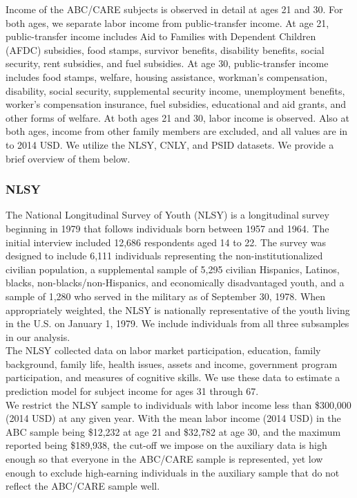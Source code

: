 \noindent Income of the ABC/CARE subjects is observed in detail at ages 21 and 30. For both ages,
we separate labor income from public-transfer income. At age 21, public-transfer income includes Aid to
Families with Dependent Children (AFDC) subsidies, food stamps, survivor benefits, disability
benefits, social security, rent subsidies, and fuel subsidies. At age 30, public-transfer income includes food stamps, welfare, housing assistance, workman's
compensation, disability, social security, supplemental security income, unemployment benefits,
worker's compensation insurance, fuel subsidies, educational and aid grants, and other forms of welfare.
At both ages 21 and 30, labor income is observed. Also at both ages, income from other family members are excluded, and all values are in
to 2014 USD. We utilize the
NLSY, CNLY, and PSID datasets. We provide a brief overview of them below. \\

\subsubsection{NLSY}
\label{app:subject_income_nlsy}

\noindent The National Longitudinal Survey of Youth (NLSY) is a longitudinal survey beginning in 1979
that follows individuals born between 1957 and 1964. The initial interview included
12,686 respondents aged 14 to 22. The survey was designed to include 6,111
individuals representing the non-institutionalized civilian population, a supplemental
sample of 5,295 civilian Hispanics, Latinos, blacks, non-blacks/non-Hispanics, and economically
disadvantaged youth, and a sample of 1,280 who served in the military as of September 30,
1978. When appropriately weighted, the NLSY is nationally representative of the youth
living in the U.S. on January 1, 1979. We include individuals from all three subsamples
in our analysis. \\

\noindent The NLSY collected data on labor market participation, education, family background,
family life, health issues, assets and income, government program participation, and
measures of cognitive skills. We use these data to estimate a prediction model for
subject income for ages 31 through 67. \\

\noindent We restrict the NLSY sample to individuals with labor income less than
\$300,000 (2014 USD) at any given year. With the mean labor income (2014 USD) in the ABC
sample being \$12,232 at age 21 and \$32,782 at age 30, and the maximum reported
being \$189,938, the cut-off we impose on the auxiliary data is high enough
so that everyone in the ABC/CARE sample is represented, yet low enough to
exclude high-earning individuals in the auxiliary sample that do not reflect the ABC/CARE sample well. \\


